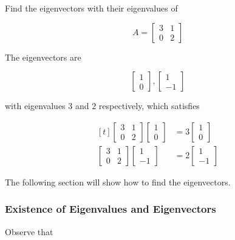 \documentclass[a4paper,12pt]{article}
\begin{document}
\begin{exm}
  Find the eigenvectors with their eigenvalues of

  $$A=\begin{bmatrix}
    3 & 1\\
    0 & 2
  \end{bmatrix}$$\s

  \ans The eigenvectors are

  $$\begin{bmatrix}
    1\\
    0
  \end{bmatrix},\begin{bmatrix}
    1\\
    -1
  \end{bmatrix}$$\s

  with eigenvalues $3$ and $2$ respectively, which satisfies

  $$\begin{aligned}[t]
    \begin{bmatrix}
      3 & 1\\
      0 & 2
    \end{bmatrix}\begin{bmatrix}
      1\\
      0
    \end{bmatrix}&=3\begin{bmatrix}
      1\\
      0
    \end{bmatrix}\\
    \begin{bmatrix}
      3 & 1\\
      0 & 2
    \end{bmatrix}\begin{bmatrix}
      1\\
      -1
    \end{bmatrix}&=2\begin{bmatrix}
      1\\
      -1
    \end{bmatrix}
  \end{aligned}$$
\end{exm}\n

The following section will show how to find the eigenvectors.

\subsubsection{Existence of Eigenvalues and Eigenvectors}
Observe that
\end{document}
